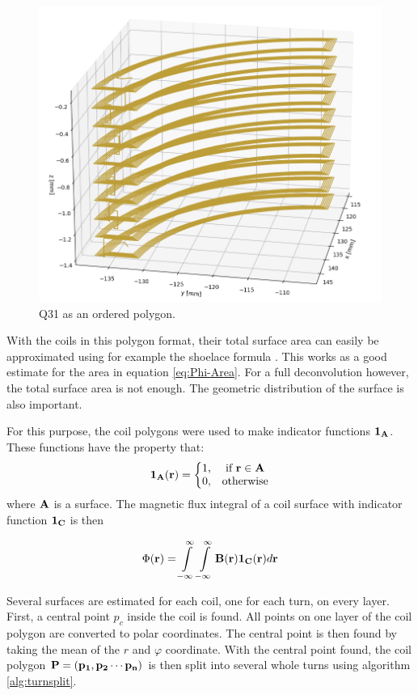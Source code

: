 \begin{figure}[!h]
    \centering
    \includegraphics[width=0.8\linewidth]{figs/pcbpolygon}
    \caption{Q31 as an ordered polygon.}
    \label{fig:pcbpolygon}
\end{figure}

With the coils in this polygon format, their total surface area can easily
be approximated using for example the shoelace formula \cite{braden_surveyors_1986}.
This works as a good estimate for the area in equation \ref{eq:Phi-Area}.
For a full deconvolution however, the total surface area is not
enough. The geometric distribution of the surface is also important.

For this purpose, the coil polygons were used to make indicator
functions $\vb{1_A}$. These functions have the property that:
\begin{equation}
    \vb{1_A}(\vb{r}) = \left\{
    \begin{matrix}
        1, & \text{if } \vb{r} \in \vb{A} \\
        0, & \text{otherwise}
    \end{matrix}
    \right.
\end{equation}
where $\vb{A}$ is a surface. The magnetic flux integral of a
coil surface with indicator function $\vb{1_C}$ is then

\begin{equation}
    \Phi(\vb{r}) =
    \int\limits_{-\infty}^{\infty}\int\limits_{-\infty}^{\infty}
    \vb{B}(\vb{r})\vb{1_C}(\vb{r})d\vb{r}
\end{equation}

Several surfaces are estimated for each coil, one for each turn,
on every layer. First, a central point $p_c$ inside the coil is found.
All points on one layer of the coil polygon are converted to
polar coordinates. The central point is then found by taking
the mean of the $r$ and $\varphi$ coordinate. With the central
point found, the coil polygon
$\vb{P} = \left(\vb{p_1}, \vb{p_2} \cdots \vb{p_n} \right)$
is then split into several whole turns using algorithm
\ref{alg:turnsplit}.

